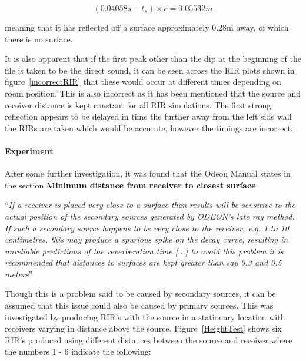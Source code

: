 \documentclass[../../main.tex]{subfiles}
\begin{document}
			\begin{equation}
			(0.04058s - t_s)\times{c} = 0.05532m
			\end{equation}

			meaning that it has reflected off a surface approximately 0.28m away, of which there is no surface.

			It is also apparent that if the first peak other than the dip at the beginning of the file is taken to be the direct sound, it can be seen across the \ac{RIR} plots shown in figure~\ref{incorrectRIR} that these would occur at different times depending on room position. This is also incorrect as it has been mentioned that the source and receiver distance is kept constant for all \ac{RIR} simulations. The first strong reflection appears to be delayed in time the further away from the left side wall the RIRs are taken which would be accurate, however the timings are incorrect.

			\paragraph{Experiment}
			After some further investigation, it was found that the Odeon Manual \cite{odeonManual} states in the section \textbf{Minimum distance from receiver to closest surface}:

			 \vspace{5mm}
			 \begin{center}
			 \begin{minipage}{0.75\textwidth}
			 ``\textit{If a receiver is placed very close to a surface then results will be sensitive to the actual position of the secondary sources generated by ODEON’s late ray method. If such a secondary source happens to be very close to the receiver, e.g. 1 to 10 centimetres, this may produce a spurious spike on the decay curve, resulting in unreliable predictions of the reverberation time [...] to avoid this problem it is recommended that distances to surfaces are kept greater than say 0.3 and 0.5 meters}''
			 \end{minipage}
			 \end{center}
			 \vspace{5mm}

			 Though this is a problem said to be caused by secondary sources, it can be assumed that this issue could also be caused by primary sources. This was investigated by producing \ac{RIR}'s with the source in a stationary location with receivers varying in distance above the source. Figure~\ref{HeightTest} shows six \ac{RIR}'s produced using different distances between the source and receiver where the numbers 1 - 6 indicate the following:
\end{document}
